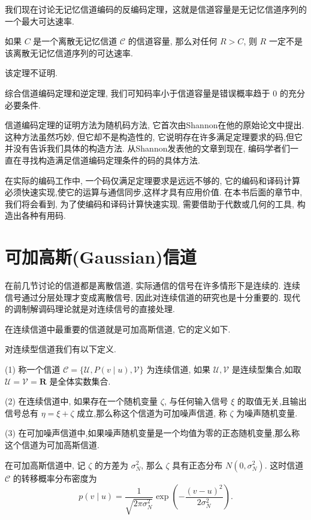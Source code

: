 我们现在讨论无记忆信道编码的反编码定理，这就是信道容量是无记忆信道序列的一个最大可达速率.

\begin{theorem}[无记忆信道编码的反编码定理]
    如果 $ C $ 是一个离散无记忆信道 $ \mathscr{C} $ 的信道容量, 那么对任何 $ R>C $, 则 $ R $ 一定不是该离散无记忆信道序列的可达速率.
\end{theorem}
该定理不证明.

综合信道编码定理和逆定理, 我们可知码率小于信道容量是错误概率趋于 0 的充分必要条件.

信道编码定理的证明方法为随机码方法, 它首次由Shannon在他的原始论文中提出.这种方法虽然巧妙, 但它却不是构造性的, 它说明存在许多满足定理要求的码,但它并没有告诉我们具体的构造方法. 从Shannon发表他的文章到现在, 编码学者们一直在寻找构造满足信道编码定理条件的码的具体方法.

在实际的编码工作中, 一个码仅满足定理要求是远远不够的, 它的编码和译码计算必须快速实现,使它的运算与通信同步,这样才具有应用价值. 在本书后面的章节中, 我们将会看到, 为了使编码和译码计算快速实现, 需要借助于代数或几何的工具, 构造出各种有用码.


\section{可加高斯(Gaussian)信道}
在前几节讨论的信道都是离散信道, 实际通信的信号在许多情形下是连续的. 连续信号通过分层处理才变成离散信号, 因此对连续信道的研究也是十分重要的. 现代的调制解调码理论就是对连续信号的直接处理.

在连续信道中最重要的信道就是可加高斯信道, 它的定义如下.
\begin{definition}
    对连续型信道我们有以下定义.
    
(1) 称一个信道 $ \mathscr{C}=\{\mathscr{U}, P(v \mid u), \mathscr{V}\} $ 为连续信道, 如果 $ \mathscr{U}, \mathscr{V} $ 是连续型集合,如取 $ \mathscr{U}=\mathscr{V}=\mathbf{R} $ 是全体实数集合.

(2) 在连续信道中, 如果存在一个随机变量 $ \zeta $, 与任何输入信号 $ \xi $ 的取值无关,且输出信号总有 $ \eta=\xi+\zeta $ 成立,那么称这个信道为可加噪声信道, 称 $ \zeta $ 为噪声随机变量.

(3) 在可加噪声信道中,如果噪声随机变量是一个均值为零的正态随机变量,那么称这个信道为可加高斯信道.
\end{definition}


在可加高斯信道中, 记 $ \zeta $ 的方差为 $ \sigma_{N}^{2} $, 那么 $ \zeta $ 具有正态分布 $ N\left(0, \sigma_{N}^{2}\right) $. 这时信道 $ \mathscr{C} $ 的转移概率分布密度为
\begin{equation}\label{4.7.1}
    p(v \mid u)=\frac{1}{\sqrt{2 \pi \sigma_{N}^{2}}} \exp \left(-\frac{(v-u)^{2}}{2 \sigma_{N}^{2}}\right) .
\end{equation}

